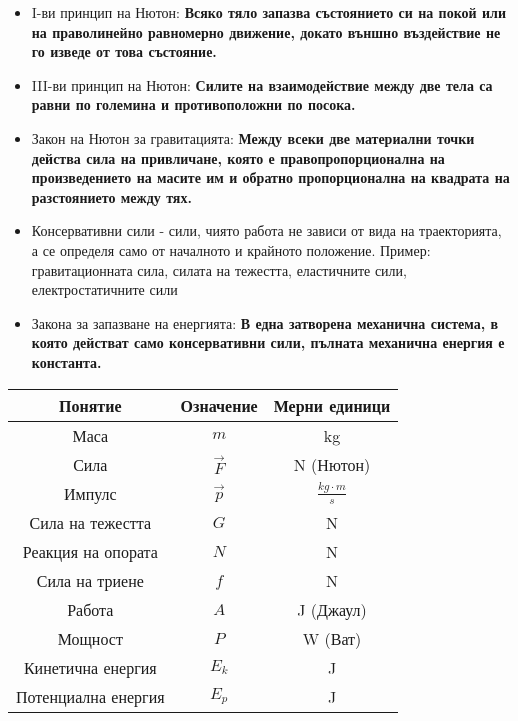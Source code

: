 \documentclass[fleqn, 12pt]{article}
\theoremstyle{definition}
\begin{document}
\begin{itemize}
\item I-ви принцип на Нютон: \textbf{Всяко тяло запазва състоянието си на покой или на праволинейно
равномерно движение, докато външно въздействие не го изведе от това състояние.}
\item III-ви принцип на Нютон: \textbf{Силите на взаимодействие между две тела са равни
по големина и противоположни по посока.}
\item Закон на Нютон за гравитацията: \textbf{Между всеки две материални точки
действа сила на привличане, която е правопропорционална на произведението на
масите им и обратно пропорционална на квадрата на разстоянието между тях.}
\item Консервативни сили - сили, чиято работа не зависи от вида на траекторията, а се определя само от началното и крайното положение. Пример: гравитационната сила, силата на тежестта, еластичните сили, електростатичните сили
\item Закона за запазване на енергията: \textbf{В една затворена механична система, в която
действат само консервативни сили, пълната механична енергия е константа.}
\end{itemize}

\begin{center}
\begin{tabular}{ |c|c|c|}
\hline
\textbf{Понятие} &\textbf{Означение} & \textbf{Мерни единици}\\
\hline
Маса & $m$ & kg \\
\hline
Сила & $\vec{F}$ & N (Нютон) \\
\hline 
Импулс & $\vec{p}$ & $\frac{kg \cdot m}{s}$ \\
\hline
Сила на тежестта & $G$ & N\\
\hline
Реакция на опората & $N$ & N \\
\hline
Сила на триене & $f$ & N \\
\hline
Работа & $A$ & J (Джаул)\\
\hline
Мощност & $P$ & W (Ват)\\
\hline
Кинетична енергия & $E_k$ & J \\
\hline
Потенциална енергия & $E_p$ & J \\
\hline
\end{tabular}
\end{center}

\newpage
\end{document}
